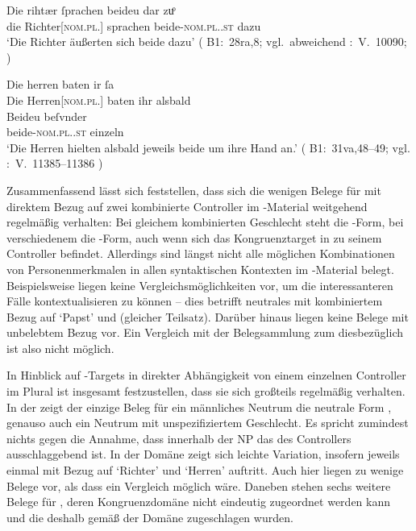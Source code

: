 \begin{exe}
\ex \label{ex:richtherriu2}
	\begin{xlist}
	\ex \label{ex:richtherriu2_1}
		\gll Die rihtær ſprachen beideu {dar zuͦ} \\
			die Richter[\textsc{nom.pl.\MascM}] sprachen beide-\textsc{nom.pl.\NeutM.st}
			dazu \\
		\trans `Die Richter äußerten sich beide dazu'
			(%
				B1:~28ra,8; vgl.~abweichend
				\KC:~V.~10090;
				\cite[267]{schroeder1895}%
			)

	\ex \label{ex:richtherriu2_2}
		\gll Die herren baten ir ſa \\
			Die Herren[\textsc{nom.pl.\MascM}] baten ihr alsbald \\
	\sn \gll Beideu beſvnder \\
			beide-\textsc{nom.pl.\NeutM.st} einzeln \\
		\trans `Die Herren hielten alsbald jeweils beide um ihre Hand an.'
			(%
				B1:~31va,48--49; vgl.
				\KC:~V.~11385--11386
				\cite[289]{schroeder1895}%
			)
	\end{xlist}
\end{exe}

Zusammenfassend lässt sich feststellen, dass sich die wenigen Belege für
 mit direktem Bezug auf zwei kombinierte Controller im
\KC{}-Material weitgehend regelmäßig verhalten: Bei gleichem
kombinierten Geschlecht steht die -Form, bei verschiedenem die
-Form, auch wenn sich das Kongruenztarget in  zu
seinem Controller befindet. Allerdings sind längst nicht alle möglichen
Kombinationen von Personenmerkmalen in allen syntaktischen Kontexten im
\KC{}-Material belegt. Beispielsweise liegen keine
Vergleichs\-möglich\-keiten vor, um die interessanteren Fälle kontextualisieren
zu können -- dies betrifft neutrales  mit kombiniertem Bezug auf
 `Papst' und  (gleicher Teilsatz). Darüber
hinaus liegen keine Belege mit unbelebtem Bezug vor. Ein Vergleich mit der
Belegsammlung zum \CAO{} diesbezüglich ist also nicht möglich.

In Hinblick auf -Targets in direkter Abhängigkeit von einem
einzelnen Controller im Plural ist insgesamt festzustellen, dass sie sich
großteils regelmäßig verhalten. In der  
zeigt der einzige Beleg für ein männliches Neutrum die neutrale Form
, genauso auch ein Neutrum mit unspezifiziertem Geschlecht. Es
spricht zumindest nichts gegen die Annahme, dass innerhalb der
NP das  des Controllers ausschlaggebend ist. In
der Domäne  zeigt sich leichte Variation, insofern jeweils
einmal  mit Bezug auf  `Richter' und 
`Herren' auftritt. Auch hier liegen zu wenige Belege vor, als dass ein
Vergleich möglich wäre. Daneben stehen sechs weitere Belege für ,
deren Kongruenzdomäne nicht eindeutig zugeordnet werden kann und
die deshalb gemäß \citet[623]{ksw2} der Domäne 
zugeschlagen wurden.

